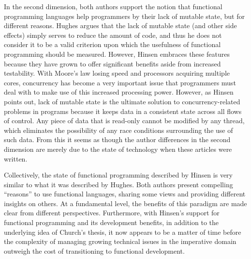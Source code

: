 \documentclass[12pt,letterpaper]{article}
\begin{document}
In the second dimension, both authors support the notion that functional programming languages help programmers
by their lack of mutable state, but for different reasons. Hughes argues that the lack of mutable state (and other side effects)
simply serves to reduce the amount of code, and thus he does not consider it to be a valid criterion upon which 
the usefulness of functional programming should be measured. 
However, Hinsen embraces these features because they have grown to offer significant benefits aside from increased
testability. With Moore's law losing speed and processors acquiring multiple cores, concurrency has become a
very important issue that programmers must deal with to make use of this increased processing power. However,
as Hinsen points out, lack of mutable state is the ultimate solution to concurrency-related problems in programs 
because it keeps data in a consistent state across all flows of control. Any piece of data that is read-only cannot be modified by any thread, which eliminates the possibility of any race conditions surrounding the use of such data. From this it seems as though the author differences in the second dimension are merely due to the state of technology when these articles were written. 

Collectively, the state of functional programming described by Hinsen is very similar to what it was described by
Hughes. Both authors present compelling ``reasons'' to use functional languages, sharing some views and providing 
different insights on others. At a fundamental level, the benefits of this paradigm are made clear from different
perspectives. Furthermore, with Hinsen's support for functional programming and its development benefits, in addition
to the underlying idea of Church's thesis, it now appears to be a matter of time before the complexity of managing growing 
technical issues in the imperative domain outweigh the cost of transitioning to functional development.




\end{document}
